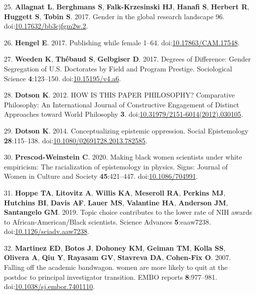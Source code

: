 \documentclass[11pt,]{article}
\begin{document}
\hypertarget{ref-allagnat_gender_2017}{}
25. \textbf{Allagnat L}, \textbf{Berghmans S}, \textbf{Falk-Krzesinski
HJ}, \textbf{Hanafi S}, \textbf{Herbert R}, \textbf{Huggett S},
\textbf{Tobin S}. 2017. Gender in the global research landscape 96.
doi:\href{https://doi.org/10.17632/bb3cjfgm2w.2}{10.17632/bb3cjfgm2w.2}.

\hypertarget{ref-erin_hengel_publishing_2017}{}
26. \textbf{Hengel E}. 2017. Publishing while female 1--64.
doi:\href{https://doi.org/10.17863/CAM.17548}{10.17863/CAM.17548}.

\hypertarget{ref-weeden_degrees_2017}{}
27. \textbf{Weeden K}, \textbf{Thébaud S}, \textbf{Gelbgiser D}. 2017.
Degrees of Difference: Gender Segregation of U.S. Doctorates by Field
and Program Prestige. Sociological Science \textbf{4}:123--150.
doi:\href{https://doi.org/10.15195/v4.a6}{10.15195/v4.a6}.

\hypertarget{ref-Dotson2012}{}
28. \textbf{Dotson K}. 2012. HOW IS THIS PAPER PHILOSOPHY? Comparative
Philosophy: An International Journal of Constructive Engagement of
Distinct Approaches toward World Philosophy \textbf{3}.
doi:\href{https://doi.org/10.31979/2151-6014(2012).030105}{10.31979/2151-6014(2012).030105}.

\hypertarget{ref-Dotson2014}{}
29. \textbf{Dotson K}. 2014. Conceptualizing epistemic oppression.
Social Epistemology \textbf{28}:115--138.
doi:\href{https://doi.org/10.1080/02691728.2013.782585}{10.1080/02691728.2013.782585}.

\hypertarget{ref-PrescodWeinstein2020}{}
30. \textbf{Prescod-Weinstein C}. 2020. Making black women scientists
under white empiricism: The racialization of epistemology in physics.
Signs: Journal of Women in Culture and Society \textbf{45}:421--447.
doi:\href{https://doi.org/10.1086/704991}{10.1086/704991}.

\hypertarget{ref-Hoppe2019}{}
31. \textbf{Hoppe TA}, \textbf{Litovitz A}, \textbf{Willis KA},
\textbf{Meseroll RA}, \textbf{Perkins MJ}, \textbf{Hutchins BI},
\textbf{Davis AF}, \textbf{Lauer MS}, \textbf{Valantine HA},
\textbf{Anderson JM}, \textbf{Santangelo GM}. 2019. Topic choice
contributes to the lower rate of NIH awards to African-American/Black
scientists. Science Advances \textbf{5}:eaaw7238.
doi:\href{https://doi.org/10.1126/sciadv.aaw7238}{10.1126/sciadv.aaw7238}.

\hypertarget{ref-Martinez2007}{}
32. \textbf{Martinez ED}, \textbf{Botos J}, \textbf{Dohoney KM},
\textbf{Geiman TM}, \textbf{Kolla SS}, \textbf{Olivera A}, \textbf{Qiu
Y}, \textbf{Rayasam GV}, \textbf{Stavreva DA}, \textbf{Cohen-Fix O}.
2007. Falling off the academic bandwagon. women are more likely to quit
at the postdoc to principal investigator transition. EMBO reports
\textbf{8}:977--981.
doi:\href{https://doi.org/10.1038/sj.embor.7401110}{10.1038/sj.embor.7401110}.
\end{document}

